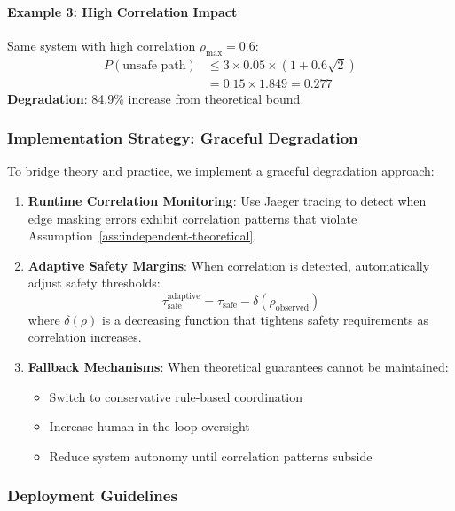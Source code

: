 \documentclass{article}
\begin{document}
\paragraph{Example 3: High Correlation Impact}
Same system with high correlation $\rho_{\max} = 0.6$:
\begin{align}
P(\text{unsafe path}) &\leq 3 \times 0.05 \times (1 + 0.6\sqrt{2}) \\
&= 0.15 \times 1.849 = 0.277
\end{align}
\textbf{Degradation}: 84.9\% increase from theoretical bound.

\subsubsection{Implementation Strategy: Graceful Degradation}

To bridge theory and practice, we implement a graceful degradation approach:

\begin{enumerate}
\item \textbf{Runtime Correlation Monitoring}: Use Jaeger tracing to detect when edge masking errors exhibit correlation patterns that violate Assumption~\ref{ass:independent-theoretical}.

\item \textbf{Adaptive Safety Margins}: When correlation is detected, automatically adjust safety thresholds:
\begin{equation}
\tau_{\text{safe}}^{\text{adaptive}} = \tau_{\text{safe}} - \delta(\rho_{\text{observed}})
\end{equation}
where $\delta(\rho)$ is a decreasing function that tightens safety requirements as correlation increases.

\item \textbf{Fallback Mechanisms}: When theoretical guarantees cannot be maintained:
\begin{itemize}
\item Switch to conservative rule-based coordination
\item Increase human-in-the-loop oversight  
\item Reduce system autonomy until correlation patterns subside
\end{itemize}
\end{enumerate}

\subsubsection{Deployment Guidelines}
\end{document}
